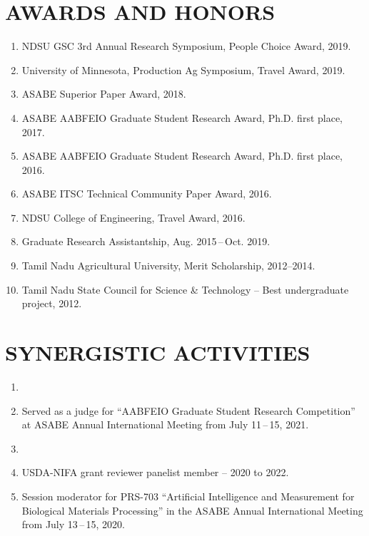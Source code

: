 \documentclass[11pt]{article}
\begin{document}
\section*{AWARDS AND HONORS}
\begin{enumerate} [itemsep=-0.8ex]
\item NDSU GSC 3rd Annual Research Symposium, People Choice Award, 2019. 
\item University of Minnesota, Production Ag Symposium, Travel Award,  2019.
\item ASABE Superior Paper Award, 2018.
\item ASABE AABFEIO Graduate Student Research Award, Ph.D. first place, 2017.
\item ASABE AABFEIO Graduate Student Research Award, Ph.D. first place, 2016.
\item ASABE ITSC Technical Community Paper Award, 2016.
\item NDSU College of Engineering, Travel Award, 2016.
\item Graduate Research Assistantship, Aug. 2015\,--\,Oct. 2019.
\item Tamil Nadu Agricultural University, Merit Scholarship, 2012--2014.
\item Tamil Nadu State Council for Science \& Technology -- Best undergraduate project, 2012.
\end{enumerate}

\section*{SYNERGISTIC ACTIVITIES}
\begin{enumerate} [itemsep=-1ex]
\item {} 
\item Served as a judge for ``AABFEIO Graduate Student Research Competition'' at ASABE Annual International Meeting from July 11\,--\,15, 2021. 
\item {} 
\item USDA-NIFA grant reviewer panelist member -- 2020 to 2022.
\item Session moderator for PRS-703 ``Artificial Intelligence and Measurement for Biological Materials Processing'' in the ASABE Annual International Meeting from July 13\,--\,15, 2020. 
\end{enumerate}
\end{document}
